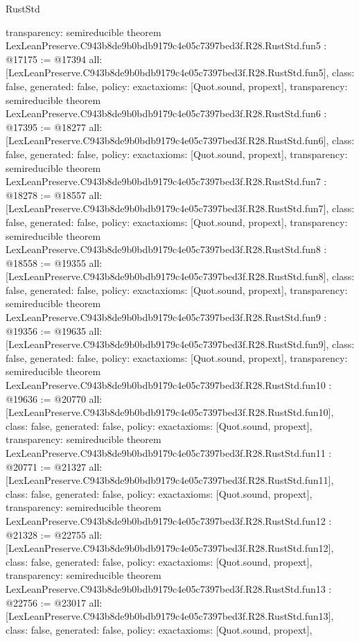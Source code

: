 \begin{lexlean}{RustStd}
\begin{coremodule}
{  transparency: semireducible
}
theorem LexLeanPreserve.C943b8de9b0bdb9179c4e05c7397bed3f.R28.RustStd.fun5 : @17175 := @17394 {
  all: [LexLeanPreserve.C943b8de9b0bdb9179c4e05c7397bed3f.R28.RustStd.fun5],
  class: false,
  generated: false,
  policy: exact{axioms: [Quot.sound, propext]},
  transparency: semireducible
}
theorem LexLeanPreserve.C943b8de9b0bdb9179c4e05c7397bed3f.R28.RustStd.fun6 : @17395 := @18277 {
  all: [LexLeanPreserve.C943b8de9b0bdb9179c4e05c7397bed3f.R28.RustStd.fun6],
  class: false,
  generated: false,
  policy: exact{axioms: [Quot.sound, propext]},
  transparency: semireducible
}
theorem LexLeanPreserve.C943b8de9b0bdb9179c4e05c7397bed3f.R28.RustStd.fun7 : @18278 := @18557 {
  all: [LexLeanPreserve.C943b8de9b0bdb9179c4e05c7397bed3f.R28.RustStd.fun7],
  class: false,
  generated: false,
  policy: exact{axioms: [Quot.sound, propext]},
  transparency: semireducible
}
theorem LexLeanPreserve.C943b8de9b0bdb9179c4e05c7397bed3f.R28.RustStd.fun8 : @18558 := @19355 {
  all: [LexLeanPreserve.C943b8de9b0bdb9179c4e05c7397bed3f.R28.RustStd.fun8],
  class: false,
  generated: false,
  policy: exact{axioms: [Quot.sound, propext]},
  transparency: semireducible
}
theorem LexLeanPreserve.C943b8de9b0bdb9179c4e05c7397bed3f.R28.RustStd.fun9 : @19356 := @19635 {
  all: [LexLeanPreserve.C943b8de9b0bdb9179c4e05c7397bed3f.R28.RustStd.fun9],
  class: false,
  generated: false,
  policy: exact{axioms: [Quot.sound, propext]},
  transparency: semireducible
}
theorem LexLeanPreserve.C943b8de9b0bdb9179c4e05c7397bed3f.R28.RustStd.fun10 : @19636 := @20770 {
  all: [LexLeanPreserve.C943b8de9b0bdb9179c4e05c7397bed3f.R28.RustStd.fun10],
  class: false,
  generated: false,
  policy: exact{axioms: [Quot.sound, propext]},
  transparency: semireducible
}
theorem LexLeanPreserve.C943b8de9b0bdb9179c4e05c7397bed3f.R28.RustStd.fun11 : @20771 := @21327 {
  all: [LexLeanPreserve.C943b8de9b0bdb9179c4e05c7397bed3f.R28.RustStd.fun11],
  class: false,
  generated: false,
  policy: exact{axioms: [Quot.sound, propext]},
  transparency: semireducible
}
theorem LexLeanPreserve.C943b8de9b0bdb9179c4e05c7397bed3f.R28.RustStd.fun12 : @21328 := @22755 {
  all: [LexLeanPreserve.C943b8de9b0bdb9179c4e05c7397bed3f.R28.RustStd.fun12],
  class: false,
  generated: false,
  policy: exact{axioms: [Quot.sound, propext]},
  transparency: semireducible
}
theorem LexLeanPreserve.C943b8de9b0bdb9179c4e05c7397bed3f.R28.RustStd.fun13 : @22756 := @23017 {
  all: [LexLeanPreserve.C943b8de9b0bdb9179c4e05c7397bed3f.R28.RustStd.fun13],
  class: false,
  generated: false,
  policy: exact{axioms: [Quot.sound, propext]},
}
\end{coremodule}
\end{lexlean}
